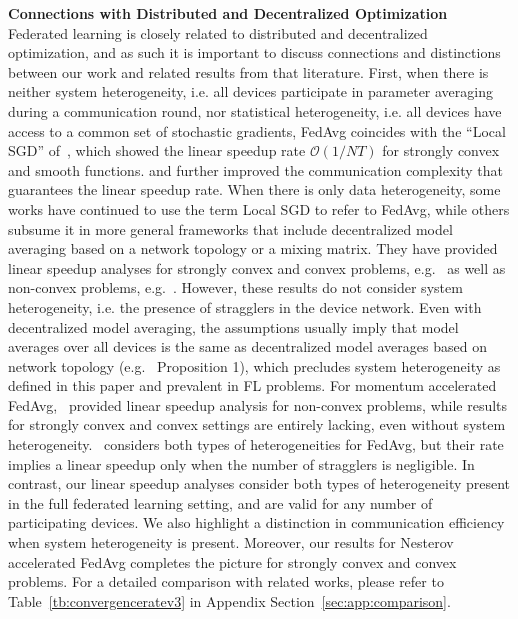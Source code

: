 \textbf{Connections with Distributed and Decentralized Optimization}
Federated learning is closely related to distributed and decentralized optimization, and as such it is important to discuss connections and distinctions between our work and related results from that literature. First, when there is neither system heterogeneity, i.e. all devices participate in parameter averaging during a communication round, nor statistical heterogeneity, i.e. all devices have access to a common set of stochastic gradients, FedAvg coincides with the ``Local SGD'' of~\cite{stich2018local}, which showed the linear speedup rate $\mathcal{O}(1/NT)$ for strongly convex and smooth functions. \cite{woodworth2020local} and \cite{woodworth2020minibatch} further improved the communication complexity that guarantees the linear speedup rate. When there is only data heterogeneity, some works have continued to use the term Local SGD to refer to FedAvg, while others subsume it in more general frameworks that include decentralized model averaging based on a network topology or a mixing matrix. They have provided linear speedup analyses for strongly convex and convex problems, e.g.~\cite{khaled2020tighter,koloskova2020unified} as well as non-convex problems, e.g.~\cite{jiang2018linear,yu2019parallel,wang2018cooperative}. However, these results do not consider system heterogeneity, i.e. the presence of stragglers in the device network. Even with decentralized model averaging, the assumptions usually imply that model averages over all devices is the same as decentralized model averages based on network topology (e.g.~\cite{koloskova2020unified} Proposition 1), which precludes system heterogeneity as defined in this paper and prevalent in FL problems. For momentum accelerated FedAvg,~\cite{yu2019linear} provided linear speedup analysis for non-convex problems, while results for strongly convex and convex settings are entirely lacking, even without system heterogeneity.~\cite{karimireddy2019scaffold} considers both types of heterogeneities for FedAvg, but their rate implies a linear speedup only when the number of stragglers is negligible. In contrast, our linear speedup analyses consider both types of heterogeneity present in the full federated learning setting, and are valid for any number of participating devices. We also highlight a distinction in communication efficiency when system heterogeneity is present. Moreover, our results for Nesterov accelerated FedAvg completes the picture for strongly convex and convex problems. For a detailed comparison with related works, please refer to Table~\ref{tb:convergenceratev3} in Appendix Section~\ref{sec:app:comparison}. 

